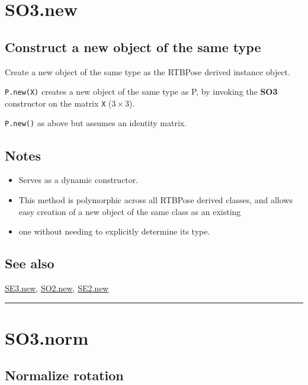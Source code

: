 \hypertarget{SO3.new}{\section*{SO3.new}}
\subsection*{Construct a new object of the same type}


Create a new object of the same type as the RTBPose derived instance object.



\texttt{P.new(X)} creates a new object of the same type as P, by invoking the \textbf{\color{red} SO3} constructor on the matrix
\texttt{X} ($3 \times 3$).



\texttt{P.new()} as above but assumes an identity matrix.


\subsection*{Notes}
\begin{itemize}
  \item Serves as a dynamic constructor.
  \item This method is polymorphic across all RTBPose derived classes, and     allows easy creation of a new object of the same class as an existing
  \item one without needing to explicitly determine its type.
\end{itemize}

\subsection*{See also}


\hyperlink{SE3.new}{\color{blue} SE3.new}, \hyperlink{SO2.new}{\color{blue} SO2.new}, \hyperlink{SE2.new}{\color{blue} SE2.new}

\vspace{1.5ex}\hrule

\hypertarget{SO3.norm}{\section*{SO3.norm}}
\subsection*{Normalize rotation}


